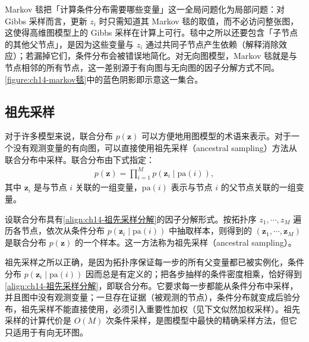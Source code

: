 \documentclass[../../main.tex]{subfiles}
\begin{document}
\begin{remark}Markov 毯把「计算条件分布需要哪些变量」这一全局问题化为局部问题：对 Gibbs 采样而言，更新 $z_{i}$ 时只需知道其 Markov 毯的取值，而不必访问整张图，这使得高维图模型上的 Gibbs 采样在计算上可行。毯中之所以还要包含「子节点的其他父节点」，是因为这些变量与 $z_{i}$ 通过共同子节点产生依赖（解释消除效应）；若漏掉它们，条件分布会被错误地简化。对无向图模型，Markov 毯就是与节点相邻的所有节点，这一差别源于有向图与无向图的因子分解方式不同。\cref{figure:ch14-markov毯}中的蓝色阴影即示意这一集合。
\end{remark}

\subsection{祖先采样}\label{subsection:ch14-祖先采样}

对于许多模型来说，联合分布 $p(\bm{z})$ 可以方便地用图模型的术语来表示。对于一个没有观测变量的有向图，可以直接使用祖先采样（ancestral sampling）方法从联合分布中采样。联合分布由下式指定：
\begin{align}
p(\bm{z})=\prod_{i=1}^{M}p\!\left(\bm{z}_{i}\mid\mathrm{pa}(i)\right),
\label{align:ch14-祖先采样分解}
\end{align}
其中 $\bm{z}_{i}$ 是与节点 $i$ 关联的一组变量，$\mathrm{pa}(i)$ 表示与节点 $i$ 的父节点关联的一组变量。

\begin{definition}[祖先采样]\label{definition:ch14-祖先采样}
设联合分布具有\eqref{align:ch14-祖先采样分解}的因子分解形式。按拓扑序 $z_{1},\cdots,z_{M}$ 遍历各节点，依次从条件分布 $p\!\left(\bm{z}_{i}\mid\mathrm{pa}(i)\right)$ 中抽取样本，则得到的 $\left(\bm{z}_{1},\cdots,\bm{z}_{M}\right)$ 是联合分布 $p(\bm{z})$ 的一个样本。这一方法称为祖先采样（ancestral sampling）。
\end{definition}

\begin{remark}祖先采样之所以正确，是因为拓扑序保证每一步的所有父变量都已被实例化，条件分布 $p\!\left(\bm{z}_{i}\mid\mathrm{pa}(i)\right)$ 因而总是有定义的；把各步抽样的条件密度相乘，恰好得到\eqref{align:ch14-祖先采样分解}，即联合分布。它要求每一步都能从条件分布中采样，并且图中没有观测变量；一旦存在证据（被观测的节点），条件分布就变成后验分布，祖先采样不能直接使用，必须引入重要性加权（见下文似然加权采样）。祖先采样的计算代价是 $O(M)$ 次条件采样，是图模型中最快的精确采样方法，但它只适用于有向无环图。
\end{remark}
\end{document}
